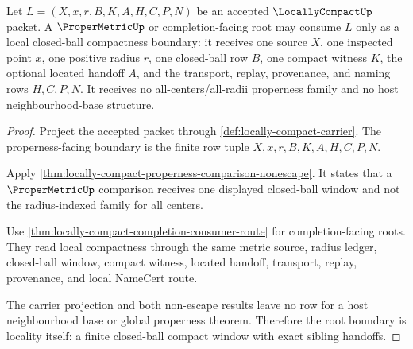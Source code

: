 \begin{theorem}
\label{thm:locallycompact-properness-locality-root-boundary}
Let $L=(X,x,r,B,K,A,H,C,P,N)$ be an accepted $\LocallyCompactUp$ packet. A $\ProperMetricUp$ or completion-facing root may consume $L$ only as a local closed-ball compactness boundary: it receives one source $X$, one inspected point $x$, one positive radius $r$, one closed-ball row $B$, one compact witness $K$, the optional located handoff $A$, and the transport, replay, provenance, and naming rows $H,C,P,N$. It receives no all-centers/all-radii properness family and no host neighbourhood-base structure.
\end{theorem}
\begin{proof}
Project the accepted packet through \autoref{def:locally-compact-carrier}. The properness-facing boundary is the finite row tuple $X,x,r,B,K,A,H,C,P,N$.

Apply \autoref{thm:locally-compact-properness-comparison-nonescape}. It states that a $\ProperMetricUp$ comparison receives one displayed closed-ball window and not the radius-indexed family for all centers.

Use \autoref{thm:locally-compact-completion-consumer-route} for completion-facing roots. They read local compactness through the same metric source, radius ledger, closed-ball window, compact witness, located handoff, transport, replay, provenance, and local NameCert route.

The carrier projection and both non-escape results leave no row for a host neighbourhood base or global properness theorem. Therefore the root boundary is locality itself: a finite closed-ball compact window with exact sibling handoffs.
\end{proof}

